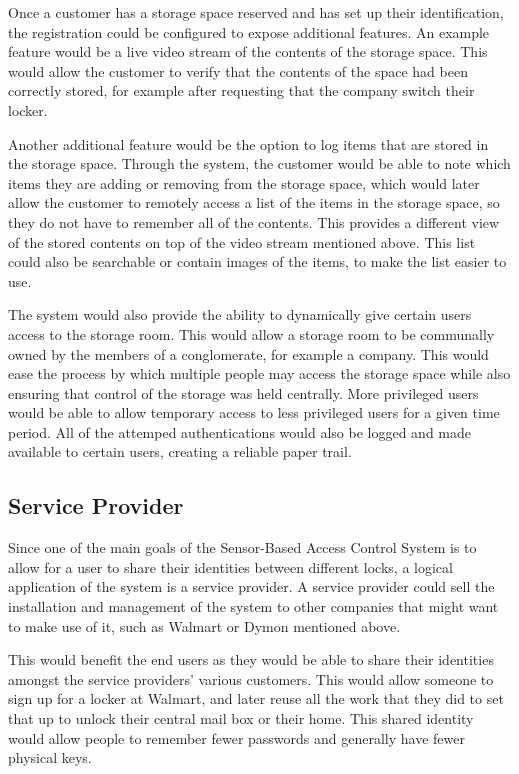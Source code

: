 \documentclass{article}
\begin{document}
Once a customer has a storage space reserved and has set up their identification, the registration could be configured
to expose additional features. An example feature would be a live video stream of the contents of the storage space.
This would allow the customer to verify that the contents of the space had been correctly stored, for example after
requesting that the company switch their locker.

Another additional feature would be the option to log items that are stored in the storage space. Through the system, the
customer would be able to note which items they are adding or removing from the storage space, which would later allow the
customer to remotely access a list of the items in the storage space, so they do not have to remember all of the contents.
This provides a different view of the stored contents on top of the video stream mentioned above. This list could also be
searchable or contain images of the items, to make the list easier to use.

The system would also provide the ability to dynamically give certain users access to the storage room. This would allow
a storage room to be communally owned by the members of a conglomerate, for example a company. This would ease the
process by which multiple people may access the storage space while also ensuring that control of the storage was held
centrally. More privileged users would be able to allow temporary access to less privileged users for a given time
period. All of the attemped authentications would also be logged and made available to certain users, creating a
reliable paper trail.

\subsection{Service Provider}

Since one of the main goals of the Sensor-Based Access Control System is to allow for a user to share their identities
between different locks, a logical application of the system is a service provider. A service provider could sell the
installation and management of the system to other companies that might want to make use of it, such as Walmart or
Dymon mentioned above.

This would benefit the end users as they would be able to share their identities amongst the service providers' various
customers. This would allow someone to sign up for a locker at Walmart, and later reuse all the work that they did to
set that up to unlock their central mail box or their home. This shared identity would allow people to remember fewer
passwords and generally have fewer physical keys.
\end{document}
